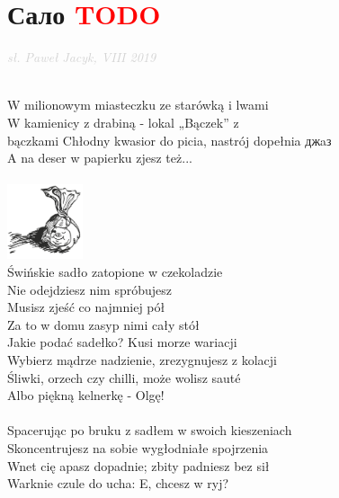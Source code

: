\documentclass[a5paper, 10pt]{book}
\begin{document}
\section{\foreignlanguage{russian}{Сало} \textcolor{red}{TODO}}\textcolor{lightgray}{\textit{sł. Paweł Jacyk, VIII 2019}}\\~\\
\begin{minipage}[t]{0.8\textwidth}
W milionowym miasteczku ze starówką i lwami	\\
W kamienicy z drabiną - lokal „Bączek” z \\bączkami		
Chłodny kwasior do picia, nastrój dopełnia \foreignlanguage{russian}{джaз}\\
A na deser w papierku zjesz też...\\
\\
\hspace*{6.5cm}\includegraphics[height=2.2cm]{images/salo.png}\vspace*{-2.21cm}\\
\hspace*{5mm}Świńskie sadło zatopione w czekoladzie	\\
\hspace*{5mm}Nie odejdziesz nim spróbujesz			\\
\hspace*{5mm}Musisz zjeść co najmniej pół			\\
\hspace*{5mm}Za to w domu zasyp nimi cały stół		\\	

Jakie podać sadełko? Kusi morze wariacji\\
Wybierz mądrze nadzienie, zrezygnujesz z kolacji\\
Śliwki, orzech czy chilli, może wolisz sauté\\
Albo piękną kelnerkę - Olgę!\\
\\
Spacerując po bruku z sadłem w swoich kieszeniach\\
Skoncentrujesz na sobie wygłodniałe spojrzenia\\
Wnet cię apasz dopadnie; zbity padniesz bez sił\\
Warknie czule do ucha: E, chcesz w ryj?\\
\end{minipage}
\end{document}
